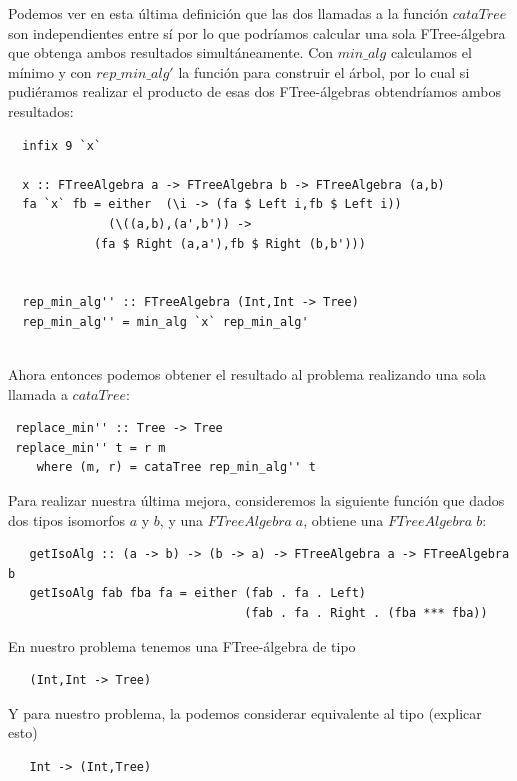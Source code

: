 \documentclass[a4paper,10pt]{article}
\begin{document}
Podemos ver en esta última definición que las dos llamadas a la función $cataTree$ son independientes
entre sí por lo que podríamos calcular una sola FTree-álgebra que obtenga ambos resultados
simultáneamente. Con $min\_alg$ calculamos el mínimo y con $rep\_min\_alg'$ la función para construir
el árbol, por lo cual si pudiéramos realizar el producto de esas dos FTree-álgebras obtendríamos ambos
resultados:

\begin{lstlisting}
  infix 9 `x`

  x :: FTreeAlgebra a -> FTreeAlgebra b -> FTreeAlgebra (a,b)
  fa `x` fb = either  (\i -> (fa $ Left i,fb $ Left i))
		      (\((a,b),(a',b')) -> 
			(fa $ Right (a,a'),fb $ Right (b,b')))
			  

  rep_min_alg'' :: FTreeAlgebra (Int,Int -> Tree)
  rep_min_alg'' = min_alg `x` rep_min_alg'
  
\end{lstlisting}

  Ahora entonces podemos obtener el resultado al problema realizando una sola llamada
  a $cataTree$:
  
\begin{lstlisting}
 replace_min'' :: Tree -> Tree
 replace_min'' t = r m
    where (m, r) = cataTree rep_min_alg'' t
\end{lstlisting}

  Para realizar nuestra última mejora, consideremos la siguiente función que dados dos
  tipos isomorfos $a$ y $b$, y una $FTreeAlgebra\;a$, obtiene una $FTreeAlgebra\;b$:

  \begin{lstlisting}
   getIsoAlg :: (a -> b) -> (b -> a) -> FTreeAlgebra a -> FTreeAlgebra b
   getIsoAlg fab fba fa = either (fab . fa . Left)
                                 (fab . fa . Right . (fba *** fba))
  \end{lstlisting}
  
  En nuestro problema tenemos una FTree-álgebra de tipo 
  
  \begin{lstlisting}
   (Int,Int -> Tree)
  \end{lstlisting}
  
  Y para nuestro problema, la podemos considerar equivalente al tipo (explicar esto)
  
  \begin{lstlisting}
   Int -> (Int,Tree)
  \end{lstlisting} 
  
\end{document}
